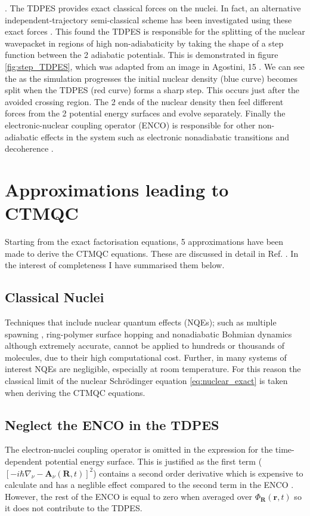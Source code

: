\cite{agostini_semiclassical_2015}. The TDPES provides exact classical forces on the nuclei. In fact, an alternative independent-trajectory semi-classical scheme has been investigated using these exact forces \cite{agostini_exact_2015}. This found the TDPES is responsible for the splitting of the nuclear wavepacket in regions of high non-adiabaticity by taking the shape of a step function between the 2 adiabatic potentials. This is demonstrated in figure \ref{fig:step_TDPES}, which was adapted from an image in Agostini, 15 \cite{agostini_semiclassical_2015}. We can see the as the simulation progresses the initial nuclear density (blue curve) becomes split when the TDPES (red curve) forms a sharp step. This occurs just after the avoided crossing region. The 2 ends of the nuclear density then feel different forces from the 2 potential energy surfaces and evolve separately. Finally the electronic-nuclear coupling operator (ENCO) is responsible for other non-adiabatic effects in the system such as electronic nonadiabatic transitions and decoherence \cite{agostini_semiclassical_2015}.
\section{Approximations leading to CTMQC}
\label{sect:CTMQC_Approx}
Starting from the exact factorisation equations, 5 approximations have been made to derive the CTMQC equations. These are discussed in detail in Ref. \cite{agostini_quantum-classical_2016}. In the interest of completeness I have summarised them below.
\subsection{Classical Nuclei}
Techniques that include nuclear quantum effects (NQEs); such as multiple spawning \cite{Martnnez*2005Oct}, ring-polymer surface hopping \cite{Shakib2017Jul} and nonadiabatic Bohmian dynamics \cite{Curchod2011Feb, Tavernelli2013Apr} although extremely accurate, cannot be applied to hundreds or thousands of molecules, due to their high computational cost. Further, in many systems of interest NQEs are negligible, especially at room temperature. For this reason the classical limit of the nuclear Schr\"odinger equation \eqref{eq:nuclear_exact} is taken when deriving the CTMQC equations.
\subsection{Neglect the ENCO in the TDPES}
The electron-nuclei coupling operator is omitted in the expression for the time-dependent potential energy surface. This is justified as the first term ($\left[-i \hbar \nabla_{\nu} - \mathbf{A}_{\nu}(\mathbf{R}, t) \right]^2$) contains a second order derivative which is expensive to calculate and has a neglible effect compared to the second term in the ENCO \cite{Scherrer2015Aug}. However, the rest of the ENCO is equal to zero when averaged over $\Phi_{\mathbf{R}}(\mathbf{r},t)$ so it does not contribute to the TDPES.
